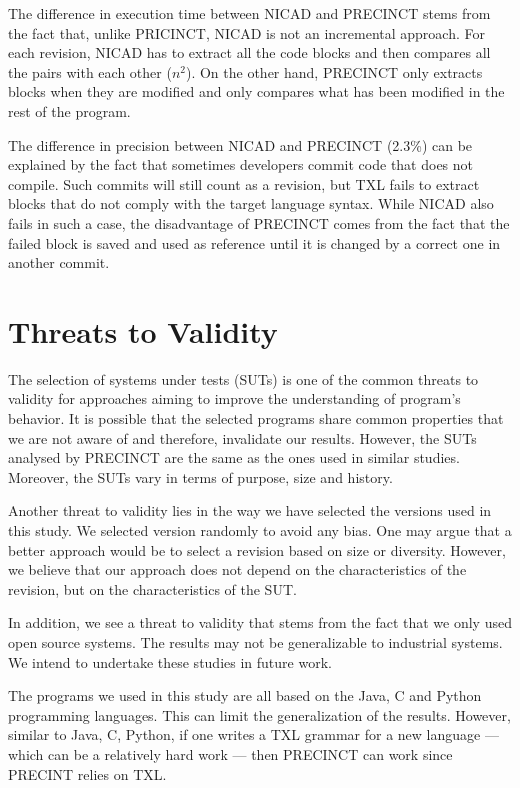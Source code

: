 \documentclass[conference]{IEEEtran}
\begin{document}
The difference in execution time between NICAD and PRECINCT stems from the fact that, unlike PRICINCT, NICAD is not an incremental approach. For each revision, NICAD has to extract all the code blocks and then compares all the pairs with each other ($n^2$). On the other hand, PRECINCT only extracts blocks when they are modified and only compares what has been modified in the rest of the program.

The difference in precision between NICAD and PRECINCT (2.3\%)  can be explained by the fact that sometimes developers commit code that does not compile.
Such commits will still count as a revision, but TXL fails to extract blocks that do not comply with the target language syntax.
While NICAD also fails in such a case, the disadvantage of PRECINCT comes from the fact that the failed block is saved and used as reference until it is changed by a correct one in another commit.

\section{Threats to Validity}
\label{sec:Threats to Validity}

The selection of systems under tests (SUTs) is one of the common threats to validity for approaches aiming to improve the understanding of program's behavior.
It is possible that the selected programs share common properties that we are not aware of and therefore, invalidate our results.
However, the SUTs analysed by PRECINCT are the same as the ones used in similar studies.
Moreover, the SUTs vary in terms of purpose, size and history.

Another threat to validity lies in the way we have selected the versions used in this study.
We selected version randomly to avoid any bias.
One may argue that a better approach would be to select a revision based on size or diversity.
However, we believe that our approach does not depend on the characteristics of the revision, but on the characteristics of the SUT.

In addition, we see a threat to validity that stems from the fact that we only used open source systems. The results may not be generalizable to industrial systems. We intend to undertake these studies in future work.

The programs we used in this study are all based on the Java, C and Python programming languages. This can limit the generalization of the results. However, similar to Java, C, Python, if one writes a TXL grammar for a new language --- which can be a relatively hard work --- then PRECINCT can work since PRECINT relies on TXL.
\end{document}
